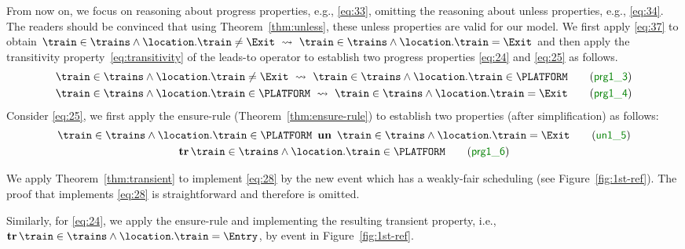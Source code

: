 From now on, we focus on reasoning about progress properties, e.g.,
\ref{eq:33}, omitting the reasoning about unless properties, e.g.,
\ref{eq:34}.  The readers should be convinced that using
Theorem~\ref{thm:unless}, these unless properties are valid for our
model.  We first apply \eqref{eq:37} to obtain $\train \in \trains
\land \location.\train \neq \Exit ~\leadsto~ \train \in \trains \land
\location.\train = \Exit$ and then apply the transitivity
property~\eqref{eq:transitivity} of the leads-to operator to establish
two progress properties \ref{eq:24} and \ref{eq:25} as follows.
\begin{gather}
  \label{eq:24}
  \train \in \trains \land \location.\train
  \neq \Exit ~\leadsto~ \train \in
  \trains \land \location.\train \in \PLATFORM
  \tag{\Binv{prg1\_3}}\\
  \label{eq:25}
  \train \in \trains \land \location.\train
  \in \PLATFORM ~\leadsto~ \train \in
  \trains \land \location.\train = \Exit
  \tag{\Binv{prg1\_4}}
\end{gather}
Consider \ref{eq:25}, we first apply the ensure-rule
(Theorem~\ref{thm:ensure-rule}) to establish two properties (after
simplification) as follows:
\begin{gather}
  \label{eq:27}
  \train \in \trains \land \location.\train \in \PLATFORM ~\un~
  \train \in \trains \land \location.\train = \Exit
  \tag{\Binv{un1\_5}}\\
  \label{eq:28}
  \tr \train \in \trains \land \location.\train \in
    \PLATFORM
  \tag{\Binv{prg1\_6}}
\end{gather}

We apply Theorem~\ref{thm:transient} to implement \ref{eq:28} by the
new event \moveout which has a weakly-fair scheduling (see
Figure~\ref{fig:1st-ref}).
The proof that \moveout implements \ref{eq:28} is straightforward and
therefore is omitted.

Similarly, for \ref{eq:24}, we apply the ensure-rule and implementing
the resulting transient property, i.e., $\tr \train \in \trains \land
\location.\train = \Entry$, by event \movein in Figure~\ref{fig:1st-ref}.

